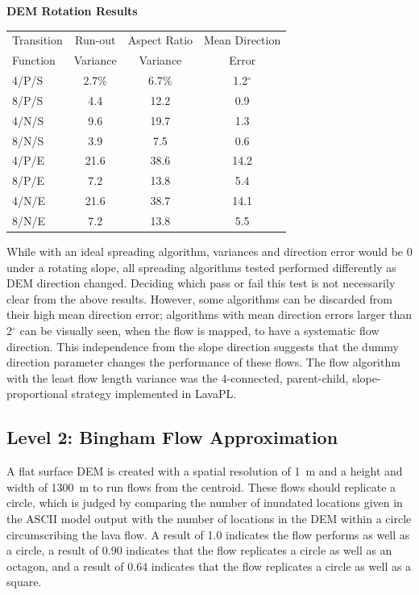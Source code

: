 \documentclass[12pt,letter]{article}
\begin{document}
		\begin{center}
			\textbf{DEM Rotation Results}
			\begin{tabular}{l c c c}
				\toprule
				Transition&Run-out&Aspect Ratio&Mean Direction\\
				Function&Variance&Variance&Error\\
				\midrule
				4/P/S &2.7\%&6.7\%&1.2$^{\circ}$\\
				8/P/S &4.4&12.2&0.9\\
				4/N/S &9.6&19.7&1.3\\
				8/N/S &3.9&7.5&0.6\\
				4/P/E &21.6&38.6&14.2\\
				8/P/E &7.2&13.8&5.4\\
				4/N/E &21.6&38.7&14.1\\
				8/N/E &7.2&13.8&5.5\\
				
				\bottomrule
			\end{tabular}
		\end{center}
		
		While with an ideal spreading algorithm, variances and direction error would be 0 under a rotating slope, all spreading algorithms tested performed differently as DEM direction changed. Deciding which pass or fail this test is not necessarily clear from the above results. However, some algorithms can be discarded from their high mean direction error; algorithms with mean direction errors larger than 2$^{\circ}$ can be visually seen, when the flow is mapped, to have a systematic flow direction. This independence from the slope direction suggests that the dummy direction parameter changes the performance of these flows. The flow algorithm with the least flow length variance was the 4-connected, parent-child, slope-proportional strategy implemented in LavaPL.

	\subsection{Level 2: Bingham Flow Approximation}
		
		A flat surface DEM is created with a spatial resolution of 1~m and a height and width of 1300~m to run flows from the centroid. These flows should replicate a circle, which is judged by comparing the number of inundated locations given in the ASCII model output with the number of locations in the DEM within a circle circumscribing the lava flow. A result of 1.0 indicates the flow performs as well as a circle, a result of 0.90 indicates that the flow replicates a circle as well as an octagon, and a result of 0.64 indicates that the flow replicates a circle as well as a square.
		
\end{document}
